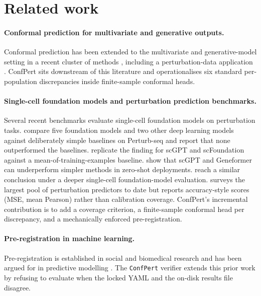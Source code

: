 \documentclass[11pt]{article}
\begin{document}
\section{Related work}

\paragraph{Conformal prediction for multivariate and generative outputs.}
Conformal prediction has been extended to the multivariate and
generative-model setting in a recent cluster of methods
\cite{meyer2026kernel,zheng2024generative,thurin2025optimal,
ndiaye2025multivariate,dheur2025generalized,yang2026cp4gen,
braun2025minvol,otcp2025}, including a perturbation-data application
\cite{asiaee2026partial}. ConfPert sits downstream of this literature
and operationalises six standard per-population discrepancies inside
finite-sample conformal heads.

\paragraph{Single-cell foundation models and perturbation prediction
benchmarks.}
Several recent benchmarks evaluate single-cell foundation models on
perturbation tasks. \citet{ahlmann2025deep} compare five foundation
models and two other deep learning models against deliberately simple
baselines on Perturb-seq and report that none outperformed the
baselines. \citet{csendes2025train} replicate the finding for scGPT and
scFoundation against a mean-of-training-examples baseline.
\citet{kedzierska2025zeroshot} show that scGPT and Geneformer can
underperform simpler methods in zero-shot deployments.
\citet{boiarsky2024deeper} reach a similar conclusion under a deeper
single-cell foundation-model evaluation. \citet{li2025systematic}
surveys the largest pool of perturbation predictors to date but reports
accuracy-style scores (MSE, mean Pearson) rather than calibration
coverage. ConfPert's incremental contribution is to add a coverage
criterion, a finite-sample conformal head per discrepancy, and a
mechanically enforced pre-registration.

\paragraph{Pre-registration in machine learning.}
Pre-registration is established in social and biomedical research
\cite{nosek2018prereg} and has been argued for in predictive modelling
\cite{hofman2023prereg,pineau2020reproducibility}. The
\texttt{ConfPert} verifier extends this prior work by refusing to
evaluate when the locked YAML and the on-disk results file disagree.
\end{document}
